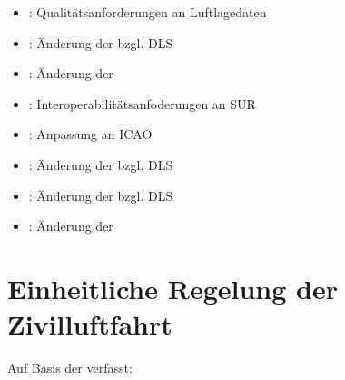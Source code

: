 \begin{itemize}
        \item {}\textdagger:  Qualitätsanforderungen an Luftlagedaten %
        \item {}\textdagger:   Änderung der  bzgl. \acs{DLS} %
        \item {}\textdagger:  Änderung der  %
        \item {}\textdagger:   Interoperabilitätsanfoderungen an \acs{SUR} %
        \item {}\textdagger:   Anpassung  an \acs{ICAO} %
        \item {}\textdagger:  Änderung der  bzgl. \acs{DLS}%
        \item {}\textdagger:   Änderung der  bzgl. \acs{DLS}%
        \item {}\textdagger:   Änderung der  %
    \end{itemize}

\section{Einheitliche Regelung der Zivilluftfahrt} 
    Auf Basis der  verfasst:

